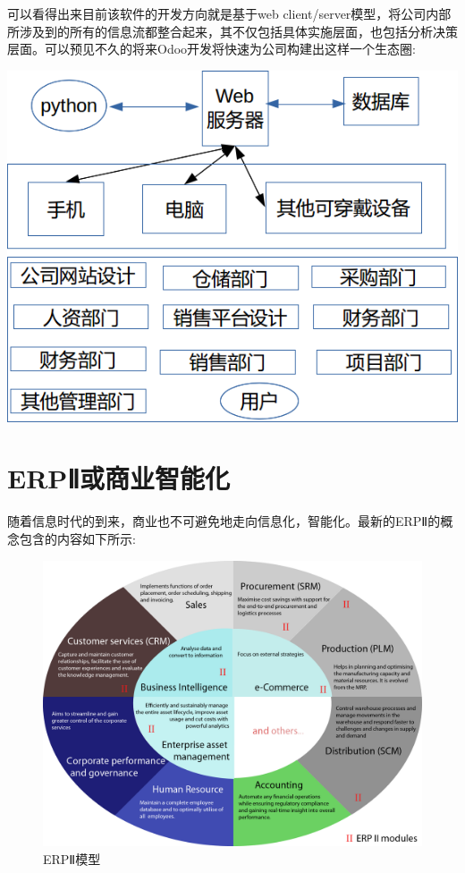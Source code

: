 \documentclass[11pt,a4paper]{sphinxmanual}
\begin{document}
可以看得出来目前该软件的开发方向就是基于web client/server模型，将公司内部所涉及到的所有的信息流都整合起来，其不仅包括具体实施层面，也包括分析决策层面。可以预见不久的将来Odoo开发将快速为公司构建出这样一个生态圈:

\includegraphics[keepaspectratio,max width=0.95\linewidth]{images/Odoo8生态圈.png}


\section{ERPⅡ或商业智能化}
\label{sec-1-2}
随着信息时代的到来，商业也不可避免地走向信息化，智能化。最新的ERPⅡ的概念包含的内容如下所示:

\begin{figure}[H]
\centering
\includegraphics[keepaspectratio,max width=0.95\linewidth]{images/ERP_Modules.png}
\caption{ERPⅡ模型}
\end{figure}
\end{document}
